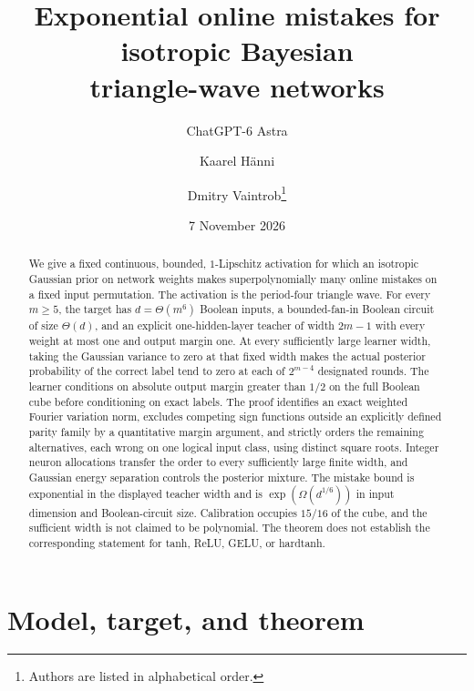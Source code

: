 \documentclass[11pt]{article}
\title{Exponential online mistakes for isotropic Bayesian\protect\\triangle-wave networks}
\author{ChatGPT-6 Astra \and Kaarel H\"anni \and Dmitry Vaintrob\thanks{Authors are listed in alphabetical order.}}
\date{7 November 2026}
\begin{document}
\maketitle

\begin{abstract}
We give a fixed continuous, bounded, $1$-Lipschitz activation for which
an isotropic Gaussian prior on network weights makes
superpolynomially many online mistakes on a fixed input permutation.
The activation is the period-four triangle wave. For every $m\ge5$,
the target has $d=\Theta(m^6)$ Boolean inputs, a bounded-fan-in Boolean
circuit of size $\Theta(d)$, and an explicit one-hidden-layer teacher
of width $2m-1$ with every weight at most one and output margin one.
At every sufficiently large learner width, taking the Gaussian variance
to zero at that fixed width makes the actual posterior probability of
the correct label tend to zero at each of $2^{m-4}$ designated rounds.
The learner conditions on absolute output margin greater than $1/2$
on the full Boolean cube before conditioning on exact labels.
The proof identifies an exact weighted Fourier variation norm,
excludes competing sign functions outside an explicitly defined parity
family by a quantitative margin argument, and strictly orders the
remaining alternatives, each wrong on one logical input class, using
distinct square roots. Integer neuron allocations transfer the order to every
sufficiently large finite width, and Gaussian energy separation controls
the posterior mixture. The mistake bound is exponential in the displayed
teacher width and is $\exp(\Omega(d^{1/6}))$ in input dimension and
Boolean-circuit size. Calibration occupies $15/16$ of the cube, and the
sufficient width is not claimed to be polynomial. The theorem does not
establish the corresponding statement for tanh, ReLU, GELU, or hardtanh.
\end{abstract}

\section{Model, target, and theorem}
\end{document}

